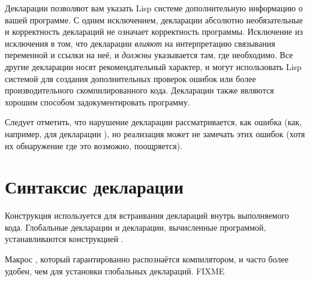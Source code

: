 Декларации позволяют вам указать Lisp системе дополнительную информацию о вашей
программе. С одним исключением, декларации абсолютно необязательные и
корректность деклараций не означает корректность программы. Исключение из
исключения в том, что декларации  \emph{влияют} на интерпретацию
связывания переменной и ссылки на неё, и \emph{должны} указывается там, где
необходимо.
Все другие декларации носят рекомендательный характер, и могут использовать Lisp
системой для создания дополнительных проверок ошибок или более производительного
скомпилированного кода. Декларации также являются хорошим способом
задокументировать программу.

Следует отметить, что нарушение декларации рассматривается, как ошибка (как,
например, для декларации ), но реализация может не замечать этих
ошибок (хотя их обнаружение где это возможно, поощряется).

\section{Синтаксис декларации}
\label{DECLARE-SYNTAX-SECTION}

Конструкция  используется для встраивания деклараций внутрь
выполняемого кода. Глобальные декларации и декларации, вычисленные программой,
устанавливаются конструкцией .

Макрос , который гарантированно 
распознаётся компилятором, и часто более удобен, чем  для
установки глобальных деклараций. FIXME

